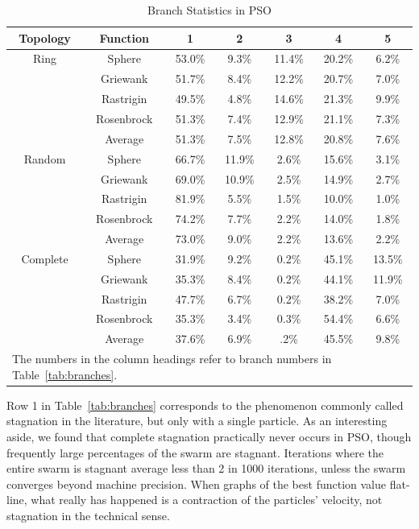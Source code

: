 \documentclass[journal,letterpaper]{IEEEtran}
\begin{document}
\begin{table}[h]
  \caption{Branch Statistics in PSO}
  \label{tab:stats}
  \centering
  \begin{tabular}{c|c|c|c|c|c|c}
	Topology&Function&1&2&3&4&5\\
	\hline
	\hline
	Ring&Sphere&53.0\%&9.3\%&11.4\%&20.2\%&6.2\%\\
	&Griewank&51.7\%&8.4\%&12.2\%&20.7\%&7.0\%\\
	&Rastrigin&49.5\%&4.8\%&14.6\%&21.3\%&9.9\%\\
	&Rosenbrock&51.3\%&7.4\%&12.9\%&21.1\%&7.3\%\\
	\cline{2-7}
	&Average&{51.3\%}&{7.5\%}&{12.8\%}&{20.8\%}&
	{7.6\%}\\
	\hline
	\hline
	Random&Sphere&66.7\%&11.9\%&2.6\%&15.6\%&3.1\%\\
	&Griewank&69.0\%&10.9\%&2.5\%&14.9\%&2.7\%\\
	&Rastrigin&81.9\%&5.5\%&1.5\%&10.0\%&1.0\%\\
	&Rosenbrock&74.2\%&7.7\%&2.2\%&14.0\%&1.8\%\\
	\cline{2-7}
	&Average&{73.0\%}&{9.0\%}&{2.2\%}&{13.6\%}&
	{2.2\%}\\
	\hline
	\hline
	Complete&Sphere&31.9\%&9.2\%&0.2\%&45.1\%&13.5\%\\
	&Griewank&35.3\%&8.4\%&0.2\%&44.1\%&11.9\%\\
	&Rastrigin&47.7\%&6.7\%&0.2\%&38.2\%&7.0\%\\
	&Rosenbrock&35.3\%&3.4\%&0.3\%&54.4\%&6.6\%\\
	\cline{2-7}
	&Average&{37.6\%}&{6.9\%}&{.2\%}&{45.5\%}&
	{9.8\%}\\
	\hline
	\multicolumn{7}{l}{The numbers in the column headings refer to branch
	numbers in Table~\ref{tab:branches}.}
  \end{tabular}
\end{table}

Row 1 in Table~\ref{tab:branches} corresponds to the phenomenon commonly called
stagnation in the literature, but only with a single particle.  As an
interesting aside, we found that complete stagnation practically never occurs
in PSO, though frequently large percentages of the swarm are stagnant.
Iterations where the entire swarm is stagnant average less than 2 in 1000
iterations, unless the swarm converges beyond machine precision.  When graphs
of the best function value flat-line, what really has happened is a contraction
of the particles' velocity, not stagnation in the technical sense.  
\end{document}
